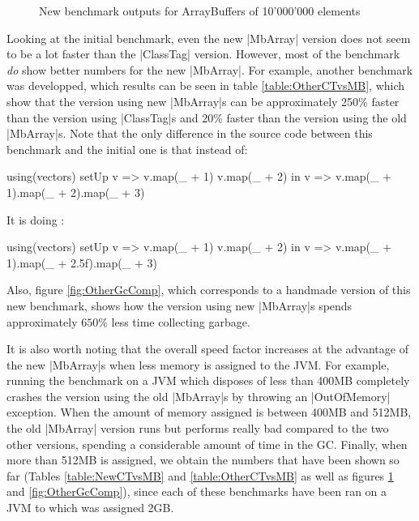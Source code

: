 

\begin{figure}
\caption{New benchmark outputs for ArrayBuffers of 10'000'000 elements}
\label{fig:NewGcComp}
\end{figure}

Looking at the initial benchmark, even the new |MbArray| version does not seem to be a lot faster than the |ClassTag| version. However, most of the benchmark \emph{do} show better numbers for the new |MbArray|. For example, another benchmark was developped, which results can be seen in table \ref{table:OtherCTvsMB}, which show that the version using new |MbArray|s can be approximately 250\% faster than the version using |ClassTag|s and 20\% faster than the version using the old |MbArray|s. Note that the only difference in the source code between this benchmark and the initial one is that instead of:

\begin{lstlisting-nobreak}
  using(vectors) setUp {
    v => 
      v.map(_ + 1)
      v.map(_ + 2)
  } in {
    v => v.map(_ + 1).map(_ + 2).map(_ + 3)
  }
\end{lstlisting-nobreak}

It is doing : 

\begin{lstlisting-nobreak}
  using(vectors) setUp {
    v => 
      v.map(_ + 1)
      v.map(_ + 2)
  } in {
    v => v.map(_ + 1).map(_ + 2.5f).map(_ + 3)
  }
\end{lstlisting-nobreak}

Also, figure \ref{fig:OtherGcComp}, which corresponds to a handmade version of this new benchmark, shows how the version using new |MbArray|s spends approximately $650\%$ less time collecting garbage.
 
It is also worth noting that the overall speed factor increases at the advantage of the new |MbArray|s when less memory is assigned to the JVM. For example, running the benchmark on a JVM which disposes of less than 400MB completely crashes the version using the old |MbArray|s by throwing an |OutOfMemory| exception. When the amount of memory assigned is between 400MB and 512MB, the old |MbArray| version runs but performs really bad compared to the two other versions, spending a considerable amount of time in the GC. Finally, when more than 512MB is assigned, we obtain the numbers that have been shown so far (Tables \ref{table:NewCTvsMB} and \ref{table:OtherCTvsMB} as well as figures \ref{fig:NewGcComp} and \ref{fig:OtherGcComp}), since each of these benchmarks have been ran on a JVM to which was assigned 2GB.

